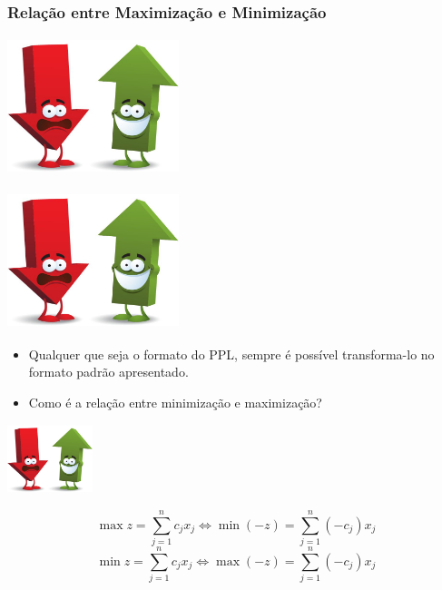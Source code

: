\begin{frame}
	\frametitle{Relação entre Maximização e Minimização}
	{
		\centering
		\includegraphics[width=5cm,height=4cm]{up-down.jpg}
	}	
	\only<2>
	{
		\centering
		\includegraphics[width=5cm,height=4cm]{up-down.jpg}
		\begin{itemize}
		\item Qualquer que seja o formato do PPL, sempre é possível transforma-lo no formato padrão apresentado.
		\item Como é a relação entre minimização e maximização?
		\end{itemize}
	}	
	{
		\centering
		\includegraphics[width=2.5cm,height=2cm]{up-down.jpg}
		\begin{mdframed}[backgroundcolor=blue!20] 
			\begin{equation*}
				\max z = \sum_{j=1}^{n}c_jx_j \Leftrightarrow \min (-z) = \sum_{j=1}^{n}(-c_j)x_j
			\end{equation*}
			\begin{equation*}
				\min z = \sum_{j=1}^{n}c_jx_j \Leftrightarrow \max (-z) = \sum_{j=1}^{n}(-c_j)x_j
			\end{equation*}
		\end{mdframed}
	}
\end{frame}

